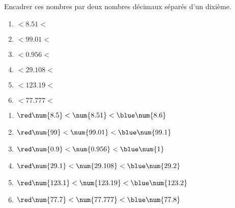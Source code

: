 \begin{exercice}
    Encadrer ces nombres par deux nombres décimaux séparés d'un dixième.
    \begin{multicols}{2}
        \begin{enumerate}
            \item \makebox[0.2\linewidth]{\dotfill}$<\num{8.51  }<$ \makebox[0.2\linewidth]{\dotfill}
            \item \makebox[0.2\linewidth]{\dotfill}$<\num{99.01 }<$ \makebox[0.2\linewidth]{\dotfill}
            \item \makebox[0.2\linewidth]{\dotfill}$<\num{0.956 }<$ \makebox[0.2\linewidth]{\dotfill}
            \item \makebox[0.2\linewidth]{\dotfill}$<\num{29.108}<$ \makebox[0.2\linewidth]{\dotfill}
            \item \makebox[0.2\linewidth]{\dotfill}$<\num{123.19}<$ \makebox[0.2\linewidth]{\dotfill}
            \item \makebox[0.2\linewidth]{\dotfill}$<\num{77.777}<$ \makebox[0.2\linewidth]{\dotfill}
        \end{enumerate}
    \end{multicols}

 \end{exercice}
 
\begin{corrige}
    \phantom{rrr}

    \begin{enumerate}
        \item ${\red\num{8.5  }} < \num{8.51  } < {\blue \num{8.6  }}$
        \item ${\red\num{99   }} < \num{99.01 } < {\blue \num{99.1 }}$
        \item ${\red\num{0.9  }} < \num{0.956 } < {\blue \num{1    }}$
        \item ${\red\num{29.1 }} < \num{29.108} < {\blue \num{29.2 }}$
        \item ${\red\num{123.1}} < \num{123.19} < {\blue \num{123.2}}$
        \item ${\red\num{77.7 }} < \num{77.777} < {\blue \num{77.8 }}$
    \end{enumerate}
\end{corrige}